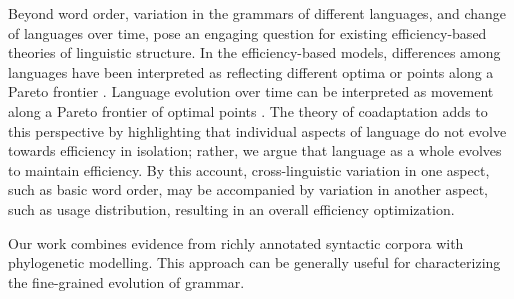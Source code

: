 \documentclass[11pt,a4paper]{article}
\begin{document}








Beyond word order, variation in the grammars of different languages, and change of languages over time, pose an engaging question for existing efficiency-based theories of linguistic structure.
In the efficiency-based models, differences among languages have been interpreted as reflecting different optima or points along a Pareto frontier \citep{kemp2018semantic, zaslavsky2018efficient}.
Language evolution over time can be interpreted as movement along a Pareto frontier of optimal points \citep{zaslavsky2019evolution}. %
The theory of coadaptation adds to this perspective by highlighting that individual aspects of language do not evolve towards efficiency in isolation; rather, we argue that language as a whole evolves to maintain efficiency.
By this account, cross-linguistic variation in one aspect, such as basic word order, may be accompanied by variation in another aspect, such as usage distribution, resulting in an overall efficiency optimization.

Our work combines evidence from richly annotated syntactic corpora with phylogenetic modelling. This approach can be generally useful for characterizing the fine-grained evolution of grammar.

\end{document}
